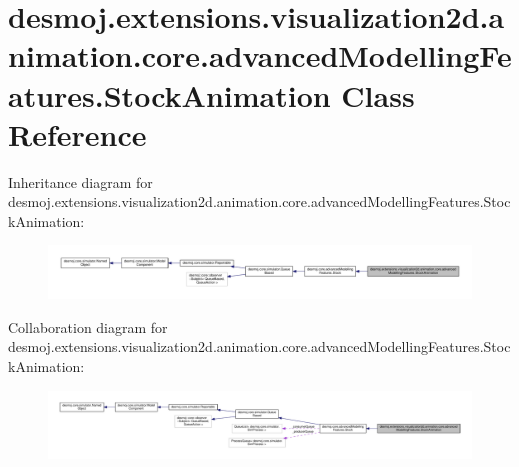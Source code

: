 \section{desmoj.\-extensions.\-visualization2d.\-animation.\-core.\-advanced\-Modelling\-Features.\-Stock\-Animation Class Reference}
\label{classdesmoj_1_1extensions_1_1visualization2d_1_1animation_1_1core_1_1advanced_modelling_features_1_1_stock_animation}


Inheritance diagram for desmoj.\-extensions.\-visualization2d.\-animation.\-core.\-advanced\-Modelling\-Features.\-Stock\-Animation\-:
\nopagebreak
\begin{figure}[H]
\begin{center}
\leavevmode
\includegraphics[width=350pt]{classdesmoj_1_1extensions_1_1visualization2d_1_1animation_1_1core_1_1advanced_modelling_featuresf9a4b652c3ac4c44bff399b26903f95e}
\end{center}
\end{figure}


Collaboration diagram for desmoj.\-extensions.\-visualization2d.\-animation.\-core.\-advanced\-Modelling\-Features.\-Stock\-Animation\-:
\nopagebreak
\begin{figure}[H]
\begin{center}
\leavevmode
\includegraphics[width=350pt]{classdesmoj_1_1extensions_1_1visualization2d_1_1animation_1_1core_1_1advanced_modelling_features753892023539b84be911d5a81707dfcb}
\end{center}
\end{figure}
